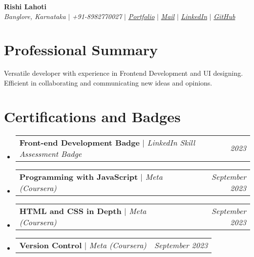 \documentclass[letterpaper,10pt]{article}
\makeatletter
\newcommand{\sectionspace}{
\vspace{-20pt}
}
\newcommand{\subheadingtitlevspace}{
\vspace{-3pt}
}
\newcommand{\titleItem}[1]{
  \textbf{#1}
}
\newcommand{\resumeProjectHeading}[2]{
    \item
    \begin{tabular*}{0.97\textwidth}{l@{\extracolsep{\fill}}r}
      #1 & \textit{ #2} \\
    \end{tabular*}\vspace{-9pt}
}
\newcommand{\resumeSubHeadingListStart}{\subheadingtitlevspace\begin{itemize}[leftmargin=0.15in, label={}]}
\newcommand{\resumeSubHeadingListEnd}{\end{itemize}}
\makeatother
\begin{document}

\begin{flushleft}
    \textbf{\large Rishi Lahoti} \\    
    \textit{Banglore, Karnataka} $|$ 
    \textit{+91-8982770027} $|$  
    \href{https://rishilahoti.vercel.app/}{{\textit{Portfolio}}} $|$
    \href{mailto:rishilahoti99@gmail.com}{{\textit{Mail}}} $|$ 
    \href{https://www.linkedin.com/in/rishi-lahoti-665889166/}{{\textit{LinkedIn}}} $|$
    \href{https://github.com/rishilahoti}{{\textit{GitHub}}}
    \vspace{-8pt}
\end{flushleft}


\section{Professional Summary}
\vspace{-3pt}
\begin{itemize}[leftmargin=0.15in, label={}]
    {\item{
     {Versatile developer with experience in Frontend Development and UI designing. Efficient in collaborating and communicating new ideas and opinions.} \\      
    }}
 \end{itemize}
 \sectionspace



\section{Certifications and Badges}
    \resumeSubHeadingListStart
      \resumeProjectHeading
          {\titleItem{Front-end Development Badge} \emph{ $|$ LinkedIn Skill Assessment Badge}}{2023}
      \resumeProjectHeading
          {\titleItem{Programming with JavaScript} \emph{ $|$ Meta (Coursera)}}{September 2023}
      \resumeProjectHeading
          {\titleItem{HTML and CSS in Depth} \emph{$|$ Meta (Coursera)}}{September 2023}
          \resumeProjectHeading
          {\titleItem{Version Control} \emph{$|$ Meta (Coursera)}}{September 2023}
    \resumeSubHeadingListEnd
\end{document}

